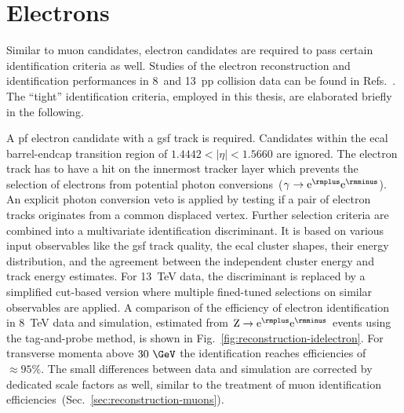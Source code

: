 \section{Electrons}
\label{sec:reconstruction-electrons}

Similar to muon candidates, electron candidates are required to pass certain identification criteria as well. Studies of the electron reconstruction and identification performances in 8~\TeV and 13~\TeV \gls{pp} collision data can be found in Refs.~\cite{Khachatryan:2015hwa,CMS-DP-2017-004}. The ``tight'' identification criteria, employed in this thesis, are elaborated briefly in the following.

A \gls{pf} electron candidate with a \gls{gsf} track is required. Candidates within the \gls{ecal} barrel-endcap transition region of $1.4442<|\eta|<1.5660$ are ignored. The electron track has to have a hit on the innermost tracker layer which prevents the selection of electrons from potential photon conversions~($\gamma\to\mathrm{e}^{\rmplus}\mathrm{e}^{\rmminus}$). An explicit photon conversion veto is applied by testing if a pair of electron tracks originates from a common displaced vertex. Further selection criteria are combined into a multivariate identification discriminant. It is based on various input observables like the \gls{gsf} track quality, the \gls{ecal} cluster shapes, their energy distribution, and the agreement between the independent cluster energy and track energy estimates. For 13~TeV data, the discriminant is replaced by a simplified cut-based version where multiple fined-tuned selections on similar observables are applied. A comparison of the efficiency of electron identification in 8~TeV data and simulation, estimated from $\mathrm{Z}\to\mathrm{e}^{\rmplus}\mathrm{e}^{\rmminus}$ events using the tag-and-probe method, is shown in Fig.~\ref{fig:reconstruction-idelectron}. For transverse momenta above $30~\GeV$ the identification reaches efficiencies of $\approx95\%$. The small differences between data and simulation are corrected by dedicated scale factors as well, similar to the treatment of muon identification efficiencies~(Sec.~\ref{sec:reconstruction-muons}).


